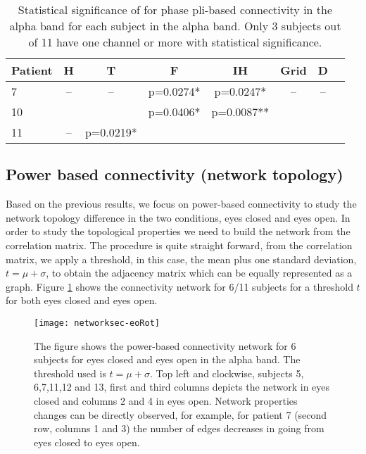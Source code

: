 \documentclass[11pt, onecolumn]{article}
\begin{document}
\begin{table}
\centering
\begin{tabular}{l*{6}{c}r}
Patient & H & T & F & IH & Grid & D  \\
\hline
7 & -- & -- &  p=0.0274* &  p=0.0247* & -- & -- \\ 
10 &  &  &   p=0.0406* &   p=0.0087** &  & \\ 
11 & --  &  p=0.0219* &  &  &  & \\
\end{tabular}
\caption{\label{Table:phaseconnectpli} 
Statistical significance of for phase pli-based connectivity in the alpha band for each subject in the alpha band. Only 3 subjects out of 11 have one channel or more with statistical significance.
}
\end{table}

\subsection{Power based connectivity (network topology)}
Based on the previous results, we focus on power-based connectivity to study the network topology difference in the two conditions, eyes closed and eyes open.  
In order to study the topological properties we need to build the network from the correlation matrix. The procedure is quite straight forward, from the correlation matrix, we apply a threshold, in this case, the mean plus one standard deviation, $t = \mu + \sigma$, to obtain the adjacency matrix which can be equally represented as a graph.
Figure \ref{fig:networkseceo} shows the connectivity network for 6/11 subjects for a threshold $t$ for both eyes closed and eyes open. 

\begin{figure}[H]
        \centering
        \texttt{[image: networksec-eoRot]}
        \caption{The figure shows the power-based connectivity network for 6 subjects for eyes closed and eyes open in the alpha band. The threshold used is $t = \mu + \sigma$. Top left and clockwise, subjects 5, 6,7,11,12 and 13, first and third columns depicts the network in eyes closed and columns 2 and 4 in eyes open. Network properties changes can be directly observed, for example, for patient 7 (second row, columns 1 and 3) the number of edges decreases in going from eyes closed to eyes open.}    
\label{fig:networkseceo}
\end{figure}
\end{document}
